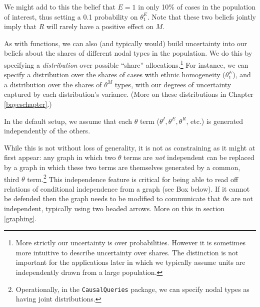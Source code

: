 \documentclass[
  12pt,
]{book}
\begin{document}
We might add to this the belief that \(E=1\) in only 10\% of cases in the population of interest, thus setting a 0.1 probability on \(\theta^E_1\). Note that these two beliefs jointly imply that \(R\) will rarely have a positive effect on \(M\).

As with functions, we can also (and typically would) build uncertainty into our beliefs about the shares of different nodal types in the population. We do this by specifying a \emph{distribution} over possible ``share'' allocations.\footnote{More strictly our uncertainty is over probabilities. However it is sometimes more intuitive to describe uncertainty over shares. The distinction is not important for the applications later in which we typically assume units are independently drawn from a large population.} For instance, we can specify a distribution over the shares of cases with ethnic homogeneity (\(\theta^E_1\)), and a distribution over the shares of \(\theta^M\) types, with our degrees of uncertainty captured by each distribution's variance. (More on these distributions in Chapter \ref{bayeschapter}.)

In the default setup, we assume that each \(\theta\) term (\(\theta^I, \theta^E, \theta^R\), etc.) is generated independently of the others.

While this is not without loss of generality, it is not as constraining as it might at first appear: any graph in which two \(\theta\) terms are \emph{not} independent can be replaced by a graph in which these two terms are themselves generated by a common, third \(\theta\) term.\footnote{Operationally, in the \texttt{CausalQueries} package, we can specify nodal types as having joint distributions.} This independence feature is critical for being able to read off relations of conditional independence from a graph (see Box below). If it cannot be defended then the graph needs to be modified to communicate that \(\theta\)s are not independent, typically using two headed arrows. More on this in section \ref{graphing}.\\
\end{document}
